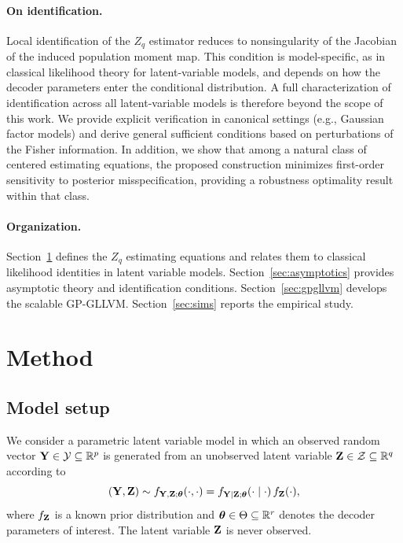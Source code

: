 \documentclass[twoside,11pt]{article}
\begin{document}
\paragraph{On identification.}
Local identification of the $Z_q$ estimator reduces to nonsingularity of the
Jacobian of the induced population moment map.
This condition is model-specific, as in classical likelihood theory for latent-variable models,
and depends on how the decoder parameters enter the conditional distribution.
A full characterization of identification across all latent-variable models
is therefore beyond the scope of this work.
We provide explicit verification in canonical settings (e.g., Gaussian factor models)
and derive general sufficient conditions based on perturbations of the Fisher information.
In addition, we show that among a natural class of centered estimating equations,
the proposed construction minimizes first-order sensitivity to posterior misspecification,
providing a robustness optimality result within that class.


\paragraph{Organization.}
Section~\ref{sec:method} defines the $Z_q$ estimating equations and relates them to classical likelihood identities in latent variable models.
Section~\ref{sec:asymptotics} provides asymptotic theory and identification conditions.
Section~\ref{sec:gpgllvm} develops the scalable GP-GLLVM.
Section~\ref{sec:sims} reports the empirical study.




\section{Method}
\label{sec:method}

\subsection{Model setup}

We consider a parametric latent variable model in which an observed random vector
${\bf Y} \in \mathcal Y \subseteq \mathbb R^p$ is generated from an unobserved latent variable
${\bf Z} \in \mathcal Z \subseteq \mathbb R^q$ according to
\[
({\bf Y},{\bf Z}) \sim f_{{\bf Y},{\bf Z};{\bm{\theta}}}(\cdot,\cdot)
= f_{{\bf Y}\mid{\bf Z};{\bm{\theta}}}(\cdot\mid\cdot)\,f_{\bf Z}(\cdot),
\]
where $f_{\bf Z}$ is a known prior distribution and ${\bm{\theta}}\in\Theta\subseteq\mathbb R^r$ denotes
the decoder parameters of interest. The latent variable ${\bf Z}$ is never observed.
\end{document}
